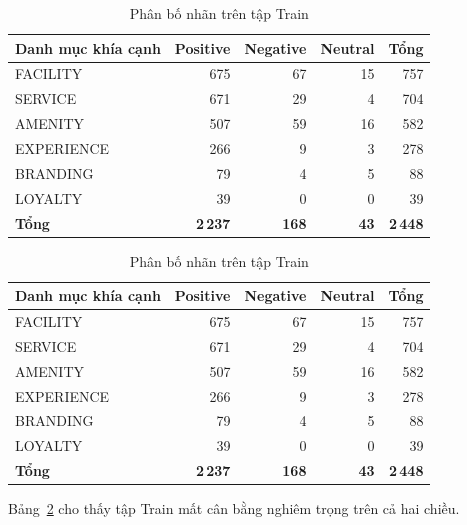 \begin{table}[H]
    \centering
    \caption{Phân bố nhãn trên tập Train}
    \label{tab:phan-bo-khia-canh-cam-xuc}
    \begin{tabular}{lrrrr}
        \toprule
        \textbf{Danh mục khía cạnh} & \textbf{Positive} & \textbf{Negative} & \textbf{Neutral} & \textbf{Tổng} \\
        \midrule
        FACILITY    & 675   & 67  & 15 & 757   \\
        SERVICE     & 671   & 29  & 4  & 704   \\
        AMENITY     & 507   & 59  & 16 & 582   \\
        EXPERIENCE  & 266   & 9   & 3  & 278   \\
        BRANDING    & 79    & 4   & 5  & 88    \\
        LOYALTY     & 39    & 0   & 0  & 39    \\
        \midrule
        \textbf{Tổng} & \textbf{2\,237} & \textbf{168} & \textbf{43} & \textbf{2\,448} \\
        \bottomrule
    \end{tabular}
\end{table}

\begin{table}[H]
    \centering
    \caption{Phân bố nhãn trên tập Train}
    \label{tab:phan-bo-khia-canh-cam-xuc}
    \begin{tabular}{lrrrr}
        \toprule
        \textbf{Danh mục khía cạnh} & \textbf{Positive} & \textbf{Negative} & \textbf{Neutral} & \textbf{Tổng} \\
        \midrule
        FACILITY    & 675 & 67 & 15 & 757 \\
        SERVICE     & 671 & 29 & 4  & 704 \\
        AMENITY     & 507 & 59 & 16 & 582 \\
        EXPERIENCE  & 266 & 9  & 3  & 278 \\
        BRANDING    & 79  & 4  & 5  & 88  \\
        LOYALTY     & 39  & 0  & 0  & 39  \\
        \midrule
        \textbf{Tổng} & \textbf{2\,237} & \textbf{168} & \textbf{43} & \textbf{2\,448} \\
        \bottomrule
    \end{tabular}
\end{table}

Bảng~\ref{tab:phan-bo-khia-canh-cam-xuc} cho thấy tập Train mất cân bằng
nghiêm trọng trên cả hai chiều.

